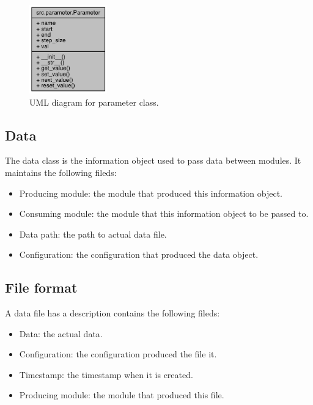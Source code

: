 \documentclass{article}
\begin{document}
    \begin{figure}[H]
        \begin{center}
            \includegraphics[width=0.3\textwidth]{fig/param_uml.png}
        \end{center}
        \label{fig:param_uml}
        \caption{UML diagram for parameter class.}
    \end{figure}

    \subsection{Data}
    \label{sec:infomation_object}
    The data class is the information object used to pass data between modules.
    It maintains the following fileds:
    \begin{itemize}
        \item Producing module: the module that produced this information object.
        \item Consuming module: the module that this information object to be passed to.
        \item Data path: the path to actual data file.
        \item Configuration: the configuration that produced the data object.
    \end{itemize}

    \subsection{File format}
    A data file has a description contains the following fileds:
    \begin{itemize}
        \item Data: the actual data.
        \item Configuration: the configuration produced the file it.
        \item Timestamp: the timestamp when it is created.
        \item Producing module: the module that produced this file.
    \end{itemize}
\end{document}
